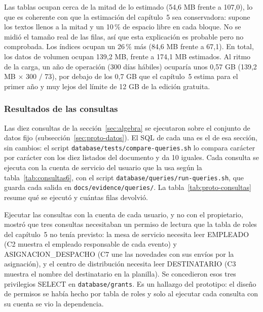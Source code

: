 Las tablas ocupan cerca de la mitad de lo estimado (54,6 MB frente a
107,0), lo que es coherente con que la estimación del capítulo~5 sea
conservadora: supone los textos llenos a la mitad y un 10\,\% de espacio
libre en cada bloque. No se midió el tamaño real de las filas, así que
esta explicación es probable pero no comprobada. Los índices ocupan un
26\,\% más (84,6 MB frente a 67,1). En total, los datos de volumen
ocupan 139,2 MB, frente a 174,1 MB estimados. Al ritmo de la carga, un
año de operación (300 días hábiles) ocuparía unos 0,57 GB
(139,2 MB $\times$ 300 $/$ 73), por debajo de los 0,7 GB que el
capítulo~5 estima para el primer año y muy lejos del límite de 12 GB de la
edición gratuita.


\subsubsection{Resultados de las consultas}
\label{sec:proto-consultas}

Las diez consultas de la sección~\ref{sec:algebra} se ejecutaron sobre
el conjunto de datos fijo (subsección~\ref{sec:proto-datos}). El SQL de
cada una es el de esa sección, sin cambios: el script
\texttt{database/tests/\allowbreak compare-queries.sh} lo compara carácter por
carácter con los diez listados del documento y da 10 iguales. Cada
consulta se ejecuta con la cuenta de servicio del usuario que la usa según la
tabla~\ref{tab:consultas6}, con el script
\texttt{database/queries/\allowbreak run-queries.sh}, que guarda cada salida en
\texttt{docs/evidence/\allowbreak queries/}. La tabla~\ref{tab:proto-consultas}
resume qué se ejecutó y cuántas filas devolvió.

Ejecutar las consultas con la cuenta de cada usuario, y no con el
propietario, mostró que tres consultas necesitaban un permiso de lectura
que la tabla de roles del capítulo~5 no tenía previsto: la mesa de servicio
necesita leer EMPLEADO (C2 muestra el empleado responsable de cada evento)
y ASIGNACION\_DESPACHO (C7 une las novedades con sus envíos por la
asignación), y el centro de distribución necesita leer DESTINATARIO (C3
muestra el nombre del destinatario en la planilla). Se concedieron esos
tres privilegios SELECT en \texttt{database/grants}. Es un hallazgo del
prototipo: el diseño de permisos se había hecho por tabla de roles y solo
al ejecutar cada consulta con su cuenta se vio la dependencia.


